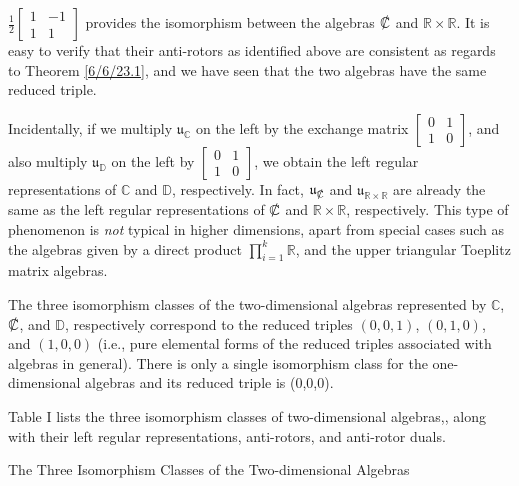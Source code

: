\documentclass{amsart}
\theoremstyle{definition}
\numberwithin{theorem}{section}
\numberwithin{equation}{section}
\begin{document}
$\frac{1}{2}\left[\begin{array}{ccc}
 1 & -1   \\ 
 1 & 1    
\end{array}\right]$ provides the isomorphism between the algebras $\slashed{\mathbb{C}}$ and $\mathbb{R} \times\mathbb{R}$.  It is easy to verify that their anti-rotors as identified above are consistent as regards to Theorem \ref{6/6/23.1}, and we have seen that the two algebras have the same reduced triple.  


Incidentally, if we multiply $\mathfrak{u}_{\mathbb{C}}$ on the left by the exchange matrix $\left[\begin{array}{ccc}
 0 & 1   \\ 
 1 & 0    
\end{array}\right]$, and also multiply $\mathfrak{u}_{\mathbb{D}}$ on the left by $\left[\begin{array}{ccc}
 0 & 1   \\ 
 1 & 0    
\end{array}\right]$, we obtain the left regular representations of $\mathbb{C}$ and $\mathbb{D}$, respectively.   In fact, $\mathfrak{u}_{\slashed{\mathbb{C}}}$ and $\mathfrak{u}_{\mathbb{R}\times\mathbb{R}}$ are already the same as the left regular representations of $\slashed{\mathbb{C}}$ and $\mathbb{R}\times\mathbb{R}$, respectively.  This type of phenomenon is {\it not} typical in higher dimensions, apart from special cases such as the algebras given by a direct product $\prod_{i=1}^k \mathbb{R}$, and the upper triangular Toeplitz matrix algebras.

 The three isomorphism classes of the two-dimensional algebras represented by $\mathbb{C}$, $\slashed{\mathbb{C}}$, and $\mathbb{D}$, respectively correspond to the reduced triples  $(0,0,1)$, $(0,1,0)$, and $(1,0,0)$ (i.e., pure elemental forms of the reduced triples associated with algebras in general).  There is only a single isomorphism class for the one-dimensional algebras and its reduced triple is (0,0,0).
 
Table I lists the three isomorphism classes of two-dimensional algebras,, along with their left regular representations, anti-rotors, and anti-rotor duals. 


\pagebreak
\hspace{0pt}
\vfill


  \centerline{\large The Three Isomorphism Classes of the Two-dimensional Algebras } 

\vspace{.5cm}
\end{document}
